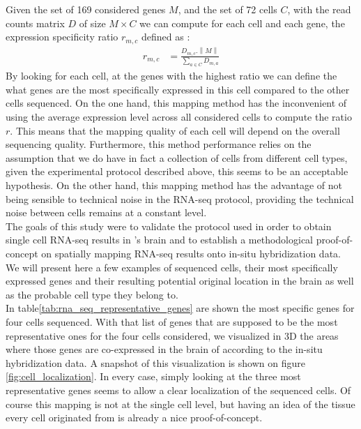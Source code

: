 	Given the set of 169 considered genes $M$, and the set of 72 cells $C$, with the read counts matrix $D$ of size $M\times C$ we can compute for each cell and each gene, the expression specificity ratio $r_{m,c}$ defined as :
\begin{eqnarray*}
	r_{m,c} &= \frac{D_{m,c}.\left\|M\right\|}{\sum_{a \in C}D_{m,a}}
\end{eqnarray*}
By looking for each cell, at the genes with the highest ratio we can define the what genes are the most specifically expressed in  this cell compared to the other cells sequenced. On the one hand, this mapping method has the inconvenient of using the average expression level across all considered cells to compute the ratio $r$. This means that the mapping quality of each cell will depend on the overall sequencing quality. Furthermore, this method performance relies on the assumption that we do have in fact a collection of cells from different cell types, given the experimental protocol described above, this seems to be an acceptable hypothesis. On the other hand, this mapping method has the advantage of not being sensible to technical noise in the RNA-seq protocol, providing the technical noise between cells remains at a constant level.\\

	The goals of this study were to validate the protocol used in order to obtain single cell RNA-seq results in \platy{}'s brain and to establish a methodological proof-of-concept on spatially mapping RNA-seq results onto in-situ hybridization data. We will present here a few examples of sequenced cells, their most specifically expressed genes and their resulting potential original location in the brain as well as the probable cell type they belong to.\\
	
	In table\ref{tab:rna_seq_representative_genes} are shown the most specific genes for four cells sequenced. With that list of genes that are supposed to be the most representative ones for the four cells considered, we visualized in 3D the areas where those genes are co-expressed in the brain of \platy{} according to the in-situ hybridization data. A snapshot of this visualization is shown on figure \ref{fig:cell_localization}. In every case, simply looking at the three most representative genes seems to allow a clear localization of the sequenced cells. Of course this mapping is not at the single cell level, but having an idea of the tissue every cell originated from is already a nice proof-of-concept.\\
	
